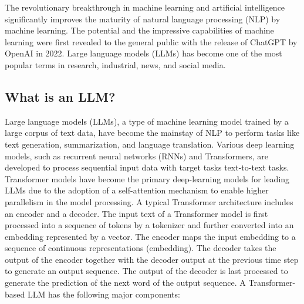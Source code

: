 The revolutionary breakthrough in machine learning and artificial intelligence significantly improves the maturity of natural language processing (NLP) by machine learning.
The potential and the impressive capabilities of machine learning were first revealed to the general public with the release of ChatGPT by OpenAI in 2022.  Large language models (LLMs) has become one of the most popular terms in research, industrial, news, and social media. 
\subsection{What is an LLM?}
Large language models (LLMs), a type of machine learning model trained by a large corpus of text data, have become the mainstay of NLP to perform tasks like text generation, summarization, and language translation.  
Various deep learning models, such as recurrent neural networks (RNNs) and Transformers, are developed to process sequential input data with target tasks text-to-text tasks.
Transformer models have become the primary deep-learning models for leading LLMs due to the adoption of a self-attention mechanism to enable higher parallelism in the model processing.
A typical Transformer architecture includes an encoder and a decoder. 
The input text of a Transformer model is first processed into a sequence of tokens by a tokenizer and further converted into an embedding represented by a vector.
The encoder maps the input embedding to a sequence of continuous representations (embedding). 
The decoder takes the output of the encoder together with the decoder output at the previous time step to generate an output sequence.
The output of the decoder is last processed to generate the prediction of the next word of the output sequence. 
A Transformer-based LLM has the following major components:
